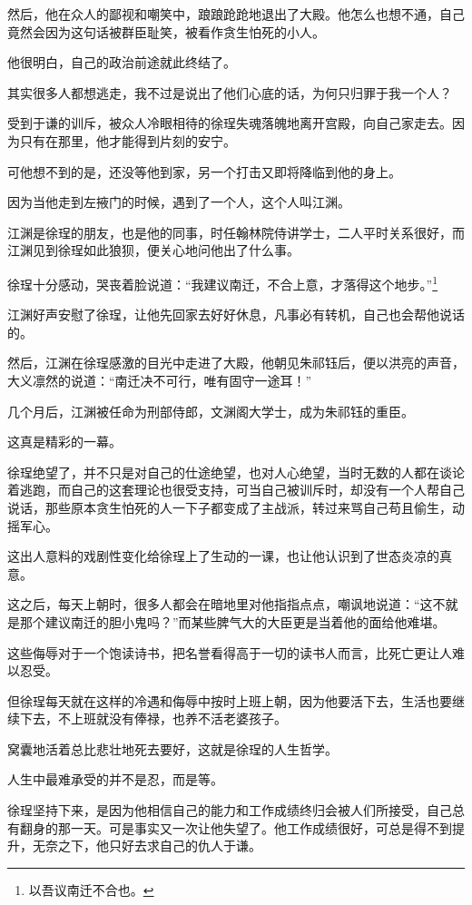 \begin{multicols}{\theparacolNo}
然后，他在众人的鄙视和嘲笑中，踉踉跄跄地退出了大殿。他怎么也想不通，自己竟然会因为这句话被群臣耻笑，被看作贪生怕死的小人。

他很明白，自己的政治前途就此终结了。

其实很多人都想逃走，我不过是说出了他们心底的话，为何只归罪于我一个人？

受到于谦的训斥，被众人冷眼相待的徐珵失魂落魄地离开宫殿，向自己家走去。因为只有在那里，他才能得到片刻的安宁。

可他想不到的是，还没等他到家，另一个打击又即将降临到他的身上。

因为当他走到左掖门的时候，遇到了一个人，这个人叫江渊。

江渊是徐珵的朋友，也是他的同事，时任翰林院侍讲学士，二人平时关系很好，而江渊见到徐珵如此狼狈，便关心地问他出了什么事。

徐珵十分感动，哭丧着脸说道：“我建议南迁，不合上意，才落得这个地步。”\footnote{以吾议南迁不合也。}

江渊好声安慰了徐珵，让他先回家去好好休息，凡事必有转机，自己也会帮他说话的。

然后，江渊在徐珵感激的目光中走进了大殿，他朝见朱祁钰后，便以洪亮的声音，大义凛然的说道：“南迁决不可行，唯有固守一途耳！”

几个月后，江渊被任命为刑部侍郎，文渊阁大学士，成为朱祁钰的重臣。

这真是精彩的一幕。

徐珵绝望了，并不只是对自己的仕途绝望，也对人心绝望，当时无数的人都在谈论着逃跑，而自己的这套理论也很受支持，可当自己被训斥时，却没有一个人帮自己说话，那些原本贪生怕死的人一下子都变成了主战派，转过来骂自己苟且偷生，动摇军心。

这出人意料的戏剧性变化给徐珵上了生动的一课，也让他认识到了世态炎凉的真意。

这之后，每天上朝时，很多人都会在暗地里对他指指点点，嘲讽地说道：“这不就是那个建议南迁的胆小鬼吗？”而某些脾气大的大臣更是当着他的面给他难堪。

这些侮辱对于一个饱读诗书，把名誉看得高于一切的读书人而言，比死亡更让人难以忍受。

但徐珵每天就在这样的冷遇和侮辱中按时上班上朝，因为他要活下去，生活也要继续下去，不上班就没有俸禄，也养不活老婆孩子。

窝囊地活着总比悲壮地死去要好，这就是徐珵的人生哲学。

人生中最难承受的并不是忍，而是等。

徐珵坚持下来，是因为他相信自己的能力和工作成绩终归会被人们所接受，自己总有翻身的那一天。可是事实又一次让他失望了。他工作成绩很好，可总是得不到提升，无奈之下，他只好去求自己的仇人于谦。


\end{multicols}
